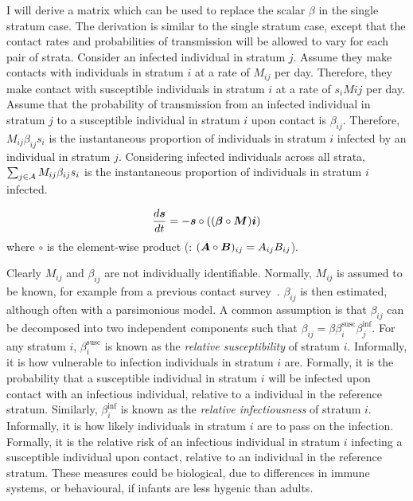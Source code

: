 \documentclass[thesis.tex]{subfiles}
\begin{document}
I will derive a matrix which can be used to replace the scalar $\beta$ in the single stratum case.
The derivation is similar to the single stratum case, except that the contact rates and probabilities of transmission will be allowed to vary for each pair of strata.
Consider an infected individual in stratum $j$.
Assume they make contacts with individuals in stratum $i$ at a rate of $M_{ij}$ per day.
Therefore, they make contact with susceptible individuals in stratum $i$ at a rate of $s_i M{ij}$ per day.
Assume that the probability of transmission from an infected individual in stratum $j$ to a susceptible individual in stratum $i$ upon contact is $\beta_{ij}$.
Therefore, $M_{ij} \beta_{ij} s_i$ is the instantaneous proportion of individuals in stratum $i$ infected by an individual in stratum $j$.
Considering infected individuals across all strata, $\sum_{j \in \mathcal{A}} M_{ij} \beta_{ij} s_i$ is the instantaneous proportion of individuals in stratum $i$ infected.

\begin{align}
    \frac{d\bm{s}}{dt} = -\bm{s} \circ ((\bm{\beta} \circ \bm{M}) \bm{i})
    \label{eq:matrix:theory}
\end{align}
where $\circ$ is the element-wise product (\ie: $(\bm{A} \circ \bm{B})_{ij} = A_{ij} B_{ij}$).

Clearly $M_{ij}$ and $\beta_{ij}$ are not individually identifiable.
Normally, $M_{ij}$ is assumed to be known, for example from a previous contact survey~\autocite[such as][]{mossongSocial}.
$\beta_{ij}$ is then estimated, although often with a parsimonious model.
A common assumption is that $\beta_{ij}$ can be decomposed into two independent components such that $\beta_{ij} = \beta \beta^\text{susc}_{i} \beta^\text{inf}_j$.
For any stratum $i$, $\beta^\text{susc}_i$ is known as the \emph{relative susceptibility} of stratum $i$.
Informally, it is how vulnerable to infection individuals in stratum $i$ are.
Formally, it is the probability that a susceptible individual in stratum $i$ will be infected upon contact with an infectious individual, relative to a individual in the reference stratum.
Similarly, $\beta^\text{inf}_i$ is known as the \emph{relative infectiousness} of stratum $i$.
Informally, it is how likely individuals in stratum $i$ are to pass on the infection.
Formally, it is the relative risk of an infectious individual in stratum $i$ infecting a susceptible individual upon contact, relative to an individual in the reference stratum.
These measures could be biological, \eg due to differences in immune systems, or behavioural, \eg if infants are less hygenic than adults.
\end{document}
